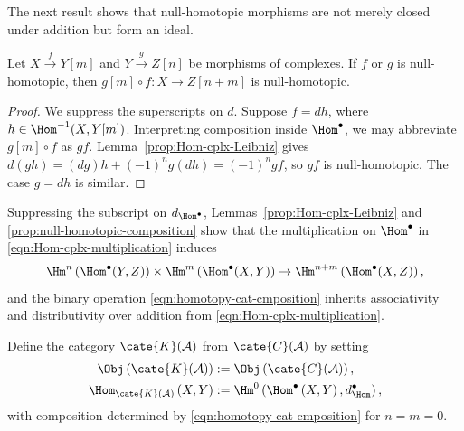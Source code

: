 The next result shows that null-homotopic morphisms are not merely closed under
addition but form an ideal.

\begin{lemma}\label{prop:null-homotopic-composition}
	Let $X\xrightarrow{f}Y[m]$ and $Y\xrightarrow{g}Z[n]$ be morphisms of
	complexes. If $f$ or $g$ is null-homotopic, then
	$g[m]\circ f:X\to Z[n+m]$ is null-homotopic.
\end{lemma}
\begin{proof}
	We suppress the superscripts on $d$. Suppose $f=dh$, where
	$h\in\Hom^{-1}(X,Y[m])$. Interpreting composition inside $\Hom^\bullet$,
	we may abbreviate $g[m]\circ f$ as $gf$. Lemma~\ref{prop:Hom-cplx-Leibniz}
	gives $d(gh)=(dg)h+(-1)^ng(dh)=(-1)^ngf$, so $gf$ is null-homotopic. The
	case $g=dh$ is similar.
\end{proof}

Suppressing the subscript on $d_{\Hom^\bullet}$,
Lemmas~\ref{prop:Hom-cplx-Leibniz} and
\ref{prop:null-homotopic-composition} show that the multiplication on
$\Hom^\bullet$ in \eqref{eqn:Hom-cplx-multiplication} induces
\begin{equation}\label{eqn:homotopy-cat-cmposition}
	\Hm^n\left(\Hom^\bullet(Y, Z) \right) \times \Hm^m\left(\Hom^\bullet(X, Y) \right) \to \Hm^{n+m}\left( \Hom^\bullet(X, Z) \right) ,
\end{equation}
and the binary operation \eqref{eqn:homotopy-cat-cmposition} inherits
associativity and distributivity over addition from
\eqref{eqn:Hom-cplx-multiplication}.

\begin{definition}\label{def:cplx-homotopy-cat}
	Define the category $\cate{K}(\mathcal{A})$ from
	$\cate{C}(\mathcal{A})$ by setting
	\begin{align*}
		\Obj\left( \cate{K}(\mathcal{A}) \right) & := \Obj\left( \cate{C}(\mathcal{A}) \right), \\
		\Hom_{\cate{K}(\mathcal{A})}\left( X, Y \right) & := \Hm^0\left( \Hom^\bullet\left( X, Y \right), d^\bullet_{\Hom} \right),
	\end{align*}
	with composition determined by \eqref{eqn:homotopy-cat-cmposition} for
	$n=m=0$.
\end{definition}

